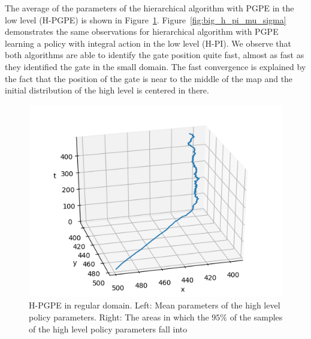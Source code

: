 
 
 The average of the parameters of the hierarchical algorithm with PGPE in the low level (H-PGPE) is shown in Figure~\ref{fig:big_h_pgpe_mu_sigma}. Figure~\ref{fig:big_h_pi_mu_sigma} demonstrates the same observations for hierarchical algorithm with PGPE learning a policy with integral action in the low level (H-PI). We observe that both algorithms are able to identify the gate position quite fast, almost as fast as they identified the gate in the small domain. The fast convergence is explained by the fact that the position of the gate is near to the middle of the map and the initial distribution of the high level is centered in there. 

\begin{figure}[t]
	\centering
    \begin{minipage}{0.55\textwidth}
        \includegraphics[width=\textwidth]{plots/big/H-PGPE-mu.png}
    \end{minipage}
    \begin{minipage}{0.44\textwidth}
    	\setlength\figureheight{5cm}  
		\setlength\figurewidth{5cm}
		
    \end{minipage}
    \caption[H-PGPE mean value and variance in regular environment]{H-PGPE in regular domain. Left: Mean parameters of the high level policy parameters. Right: The areas in which the $95\%$ of the samples of the high level policy parameters fall into}
    \label{fig:big_h_pgpe_mu_sigma}
\end{figure}


